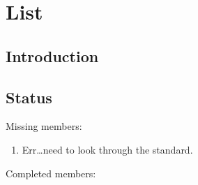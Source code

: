 
\chapter{List}

\section{Introduction}

\section{Status}

Missing members:

\begin{enumerate}
    \item Err\ldots need to look through the standard.
\end{enumerate}

Completed members:

